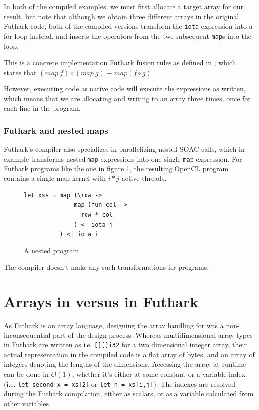 In both of the compiled examples, we must first allocate a target array for our
result, but note that although we obtain three different arrays in the original
Futhark code, both of the compiled versions transform the \texttt{iota}
expression into a for-loop instead, and inserts the operators from the two
subsequent \texttt{map}s into the loop.

This is a concrete implementation Futhark fusion rules as defined in \cite{pldi17}; which states
that $(map~f) \circ (map~g) \equiv map (f \circ g)$

However, executing \fshark{} code as native \fsharp{} code will execute the
expressions as written, which means that we are allocating and writing to an
array three times, once for each line in the program.

\subsubsection*{Futhark and nested maps}
Futhark's compiler also specializes in parallelizing nested SOAC
calls\cite{pldi17}, which in example transforms nested \texttt{map} expressions into one
single \texttt{map} expression. For Futhark programs like the one in figure
\ref{fig:fsharpnested}, the resulting OpenCL program contains a single map
kernel with $i * j$ active threads.

\begin{figure}[h]
  \centering
\begin{verbatim}
let xss = map (\row ->
              map (fun col ->
                row * col
              ) <| iota j
          ) <| iota i
\end{verbatim}
  \caption{A nested \fshark{} program}
  \label{fig:fsharpnested}
\end{figure}

The \fsharp{} compiler doesn't make any such transformations for \fshark{} programs.

\section{Arrays in \fsharp{} versus in Futhark}
As Futhark is an array language, designing the array handling for \fshark{} was
a non-inconsequential part of the design process.
Whereas multidimensional array types in Futhark are written as i.e. \texttt{[][]i32}
for a two dimensional integer array, their actual representation in the compiled
code is a flat array of bytes, and an array of integers denoting the lengths of
the dimensions.
Accessing the array at runtime can be done in $O(1)$, whether it's
either at some constant or a variable index (i.e. \texttt{let second\_x = xs[2]} or \texttt{let n = xs[i,j]}).
The indexes are resolved during the Futhark compilation, either as scalars, or
as a variable calculated from other variables.


